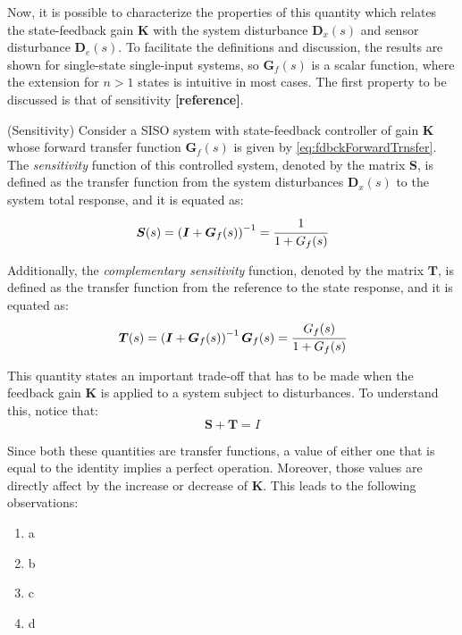 \documentclass[a4paper,11pt]{book}
\numberwithin{figure}{chapter}
\numberwithin{equation}{chapter}
\numberwithin{table}{chapter}
\theoremstyle{definition}
\newtheorem{definition}{Definition}[chapter]
\newcounter{boxed-theorem}
\newcounter{boxed-definition}
\newenvironment{boxed-definition}[1]
{\begin{shaded} \begin{definition}{#1}}
{\end{definition} \end{shaded}}
\begin{document}
Now, it is possible to characterize the properties of this quantity which relates the state-feedback gain $\bm{K}$ with the system disturbance $\bm{D}_x(s)$ and sensor disturbance $\bm{D}_e(s)$. To facilitate the definitions and discussion, the results are shown for single-state single-input systems, so $\bm{G}_f(s)$ is a scalar function, where the extension for $n > 1$ states is intuitive in most cases. The first property to be discussed is that of sensitivity \textbf{[reference]}. 

\begin{boxed-definition}{(Sensitivity)} \label{def:sensitivity}
	Consider a SISO system with state-feedback controller of gain $\bm{K}$ whose forward transfer function $\bm{G}_{f}(s)$ is given by \eqref{eq:fdbckForwardTrnsfer}. The \textit{sensitivity} function of this controlled system, denoted by the matrix $\bm{S}$, is defined as the transfer function from the system disturbances $\bm{D}_x(s)$ to the system total response, and it is equated as:
	\begin{equation}
		\bm{S}(s) = \left( \bm{I} + \bm{G}_f(s) \right)^{-1} = \cfrac{1}{1+G_f(s)}
	\end{equation}
	
	Additionally, the \textit{complementary sensitivity} function, denoted by the matrix $\bm{T}$, is defined as the transfer function from the reference to the state response, and it is equated as:
	\begin{equation}
		\bm{T}(s) = \left( \bm{I} + \bm{G}_f(s) \right)^{-1} \bm{G}_f(s) = \cfrac{G_f(s)}{1+G_f(s)}
	\end{equation}
\end{boxed-definition}

This quantity states an important trade-off that has to be made when the feedback gain $\bm{K}$ is applied to a system subject to disturbances. To understand this, notice that:
\begin{equation}
	\bm{S} + \bm{T} = I
\end{equation}

Since both these quantities are transfer functions, a value of either one that is equal to the identity implies a perfect operation. Moreover, those values are directly affect by the increase or decrease of $\bm{K}$. This leads to the following observations:

\begin{enumerate}
	\item a
	\item b
	\item c
	\item d
\end{enumerate}
\end{document}
